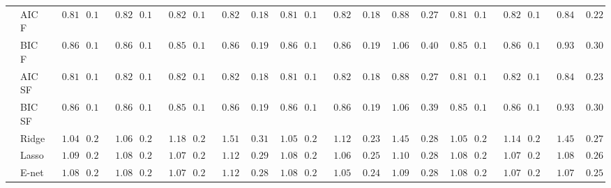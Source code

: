 \begin{tabular}{ll|ll|llllll|llllll|llllll}
 & AIC F  & $\phantom{0}0.81$ & $0.18$ & $\phantom{0}0.82$ & $0.18$ & $\phantom{0}0.82$ & $0.18$ & $\phantom{0}0.82$ & $\phantom{0}0.18$ & $\phantom{0}0.81$ & $0.17$ & $\phantom{0}0.82$ & $\phantom{0}0.18$ & $\phantom{0}0.88$ & $\phantom{0}0.27$ & $\phantom{0}0.81$ & $0.17$ & $\phantom{0}0.82$ & $0.18$ & $\phantom{0}0.84$ & $\phantom{0}0.22$ \\
 & BIC F  & $\phantom{0}0.86$ & $0.18$ & $\phantom{0}0.86$ & $0.19$ & $\phantom{0}0.85$ & $0.18$ & $\phantom{0}0.86$ & $\phantom{0}0.19$ & $\phantom{0}0.86$ & $0.17$ & $\phantom{0}0.86$ & $\phantom{0}0.19$ & $\phantom{0}1.06$ & $\phantom{0}0.40$ & $\phantom{0}0.85$ & $0.18$ & $\phantom{0}0.86$ & $0.19$ & $\phantom{0}0.93$ & $\phantom{0}0.30$ \\
 & AIC SF  & $\phantom{0}0.81$ & $0.18$ & $\phantom{0}0.82$ & $0.18$ & $\phantom{0}0.82$ & $0.18$ & $\phantom{0}0.82$ & $\phantom{0}0.18$ & $\phantom{0}0.81$ & $0.17$ & $\phantom{0}0.82$ & $\phantom{0}0.18$ & $\phantom{0}0.88$ & $\phantom{0}0.27$ & $\phantom{0}0.81$ & $0.17$ & $\phantom{0}0.82$ & $0.18$ & $\phantom{0}0.84$ & $\phantom{0}0.23$ \\
 & BIC SF  & $\phantom{0}0.86$ & $0.18$ & $\phantom{0}0.86$ & $0.19$ & $\phantom{0}0.85$ & $0.18$ & $\phantom{0}0.86$ & $\phantom{0}0.19$ & $\phantom{0}0.86$ & $0.17$ & $\phantom{0}0.86$ & $\phantom{0}0.19$ & $\phantom{0}1.06$ & $\phantom{0}0.39$ & $\phantom{0}0.85$ & $0.18$ & $\phantom{0}0.86$ & $0.19$ & $\phantom{0}0.93$ & $\phantom{0}0.30$ \\
 & Ridge  & $\phantom{0}1.04$ & $0.21$ & $\phantom{0}1.06$ & $0.22$ & $\phantom{0}1.18$ & $0.24$ & $\phantom{0}1.51$ & $\phantom{0}0.31$ & $\phantom{0}1.05$ & $0.21$ & $\phantom{0}1.12$ & $\phantom{0}0.23$ & $\phantom{0}1.45$ & $\phantom{0}0.28$ & $\phantom{0}1.05$ & $0.23$ & $\phantom{0}1.14$ & $0.22$ & $\phantom{0}1.45$ & $\phantom{0}0.27$ \\
 & Lasso  & $\phantom{0}1.09$ & $0.25$ & $\phantom{0}1.08$ & $0.25$ & $\phantom{0}1.07$ & $0.25$ & $\phantom{0}1.12$ & $\phantom{0}0.29$ & $\phantom{0}1.08$ & $0.24$ & $\phantom{0}1.06$ & $\phantom{0}0.25$ & $\phantom{0}1.10$ & $\phantom{0}0.28$ & $\phantom{0}1.08$ & $0.24$ & $\phantom{0}1.07$ & $0.25$ & $\phantom{0}1.08$ & $\phantom{0}0.26$ \\
 & E-net  & $\phantom{0}1.08$ & $0.25$ & $\phantom{0}1.08$ & $0.25$ & $\phantom{0}1.07$ & $0.24$ & $\phantom{0}1.12$ & $\phantom{0}0.28$ & $\phantom{0}1.08$ & $0.24$ & $\phantom{0}1.05$ & $\phantom{0}0.24$ & $\phantom{0}1.09$ & $\phantom{0}0.28$ & $\phantom{0}1.08$ & $0.25$ & $\phantom{0}1.07$ & $0.25$ & $\phantom{0}1.07$ & $\phantom{0}0.25$ \\

\end{tabular}
